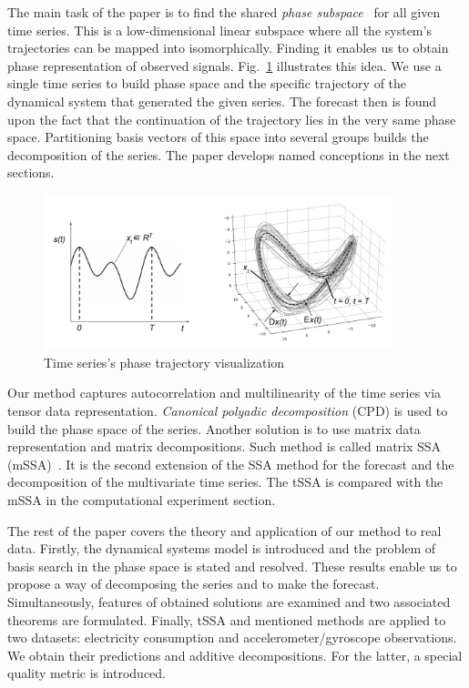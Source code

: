 \documentclass[referee, pdflatex, sn-mathphys-num]{sn-jnl}
\theoremstyle{definition}
\theoremstyle{plain}
\begin{document}
	The main task of the paper is to find the shared \emph{phase subspace}~\cite{1572261550523548160, ignatov2016human} for all given time series. This is a low-dimensional linear subspace where all the system's trajectories can be mapped into isomorphically. Finding it enables us to obtain phase representation of observed signals. Fig.~\ref{pic:phase_traj} illustrates this idea. We use a single time series to build phase space and the specific trajectory of the dynamical system that generated the given series. The forecast then is found upon the fact that the continuation of the trajectory lies in the very same phase space. Partitioning basis vectors of this space into several groups builds the decomposition of the series. The paper develops named conceptions in the next sections.
	
	\begin{figure}[h]
		\centering
		\includegraphics[width=0.9\textwidth, keepaspectratio]{phase_traj.png}
		\caption{Time series's phase trajectory visualization }\label{pic:phase_traj}
	\end{figure}
	
	Our method captures autocorrelation and multilinearity of the time series via tensor data representation. \emph{Canonical polyadic decomposition} (CPD) is used to build the phase space of the series. Another solution is to use matrix data representation and matrix decompositions. Such method is called matrix SSA (mSSA)~\cite{mSSA_overview}. It is the second extension of the SSA method for the forecast and the decomposition of the multivariate time series. The tSSA is compared with the mSSA in the computational experiment section.
	
	The rest of the paper covers the theory and application of our method to real data. Firstly, the dynamical systems model is introduced and the problem of basis search in the phase space is stated and resolved. These results enable us to propose a way of decomposing the series and to make the forecast. Simultaneously, features of obtained solutions are examined and two associated theorems are formulated. Finally, tSSA and mentioned methods are applied to two datasets: electricity consumption and accelerometer/gyroscope observations. We obtain their predictions and additive decompositions. For the latter, a special quality metric is introduced.
	
\end{document}
